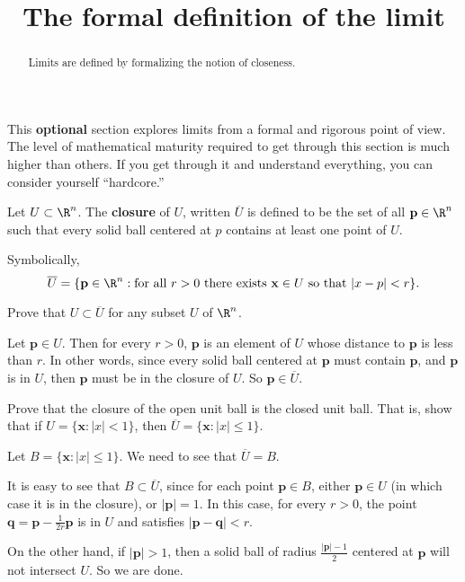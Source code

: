 \documentclass{ximera}
\title{ The formal definition of the limit}
\begin{document}
\begin{abstract}
	Limits are defined by formalizing the notion of closeness.
\end{abstract}

This \textbf{optional} section explores limits from a formal and rigorous point of view.   
The level of mathematical maturity required to get through this section is much higher than others. 
If you get through it and understand everything, you can consider yourself ``hardcore.''

\begin{definition}
	Let $U \subset \R^n$.  The \textbf{closure} of $U$, written $\overline{U}$ is defined to be the set of all $\mathbf{p} \in \R^n$ such that
	every solid ball centered at $p$ contains at least one point of $U$.

        Symbolically,
	$$\overline{U} = \{ \mathbf{p} \in \R^n : \text{for all $r>0$ there exists $\mathbf{x} \in U$ so that $|x-p|<r$} \}.$$
\end{definition}

Prove that $U \subset \overline{U}$ for any subset $U$ of $\R^n$.
\begin{free-response}
	
	Let $\mathbf{p} \in U$.  Then for every $r >0$, $\mathbf{p}$ is an element of $U$ whose distance to $\mathbf{p}$ is less than $r$.  In other words,
	since every solid ball centered at $\mathbf{p}$ must contain $\mathbf{p}$, and $\mathbf{p}$ is in $U$, then $\mathbf{p}$ must be in the closure of $U$. 
	So $\mathbf{p} \in \overline{U}$.
	
\end{free-response}


Prove that the closure of the open unit ball is the closed unit ball.  That is, show that if $U = \{\mathbf{x}:|x|<1\}$, then $\overline{U}  = \{\mathbf{x}:|x|\leq 1\}$.

\begin{free-response}
	 Let $B = \{\mathbf{x}:|x|\leq 1\}$.  We need to see that $\overline{U} = B$.
	 
	 It is easy to see that $B \subset \overline{U}$, since for each point $\mathbf{p} \in B$, either $\mathbf{p} \in U$ (in which case it is in the closure), 
	 or $|\mathbf{p}| = 1$.  In this case, for every $r > 0$, the point $\mathbf{q} = \mathbf{p} - \frac{1}{2r}\mathbf{p}$ is in $U$ and satisfies 
	  $|\mathbf{p} - \mathbf{q}|<r$.
	  
	  On the other hand, if $|\mathbf{p}|>1$, then a solid ball of radius $\frac{|\mathbf{p}|-1}{2}$ centered at $\mathbf{p}$ will not intersect $U$.  So we are done.
\end{free-response}
\end{document}
